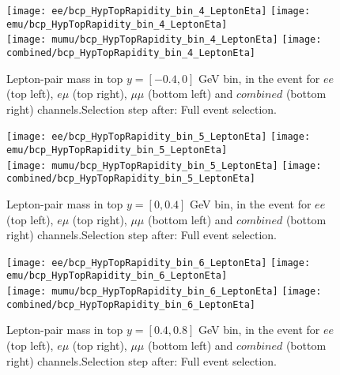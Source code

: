 \documentclass[12pt, a4paper, titlepage]{article}
\begin{document}
\begin{figure}
  \texttt{[image: ee/bcp\_HypTopRapidity\_bin\_4\_LeptonEta]}
  \texttt{[image: emu/bcp\_HypTopRapidity\_bin\_4\_LeptonEta]}\\
  \texttt{[image: mumu/bcp\_HypTopRapidity\_bin\_4\_LeptonEta]}
  \texttt{[image: combined/bcp\_HypTopRapidity\_bin\_4\_LeptonEta]}
\caption{Lepton-pair mass in top $y = [-0.4,0]$ GeV bin, in the event for $ee$ (top left), $e\mu$ (top right), $\mu\mu$ (bottom left) and $combined$ (bottom right) channels.\newline Selection step after: Full event selection.}
\end{figure}

\clearpage
\newpage


\begin{figure}
  \texttt{[image: ee/bcp\_HypTopRapidity\_bin\_5\_LeptonEta]}
  \texttt{[image: emu/bcp\_HypTopRapidity\_bin\_5\_LeptonEta]}\\
  \texttt{[image: mumu/bcp\_HypTopRapidity\_bin\_5\_LeptonEta]}
  \texttt{[image: combined/bcp\_HypTopRapidity\_bin\_5\_LeptonEta]}
\caption{Lepton-pair mass in top $y = [0,0.4]$ GeV bin, in the event for $ee$ (top left), $e\mu$ (top right), $\mu\mu$ (bottom left) and $combined$ (bottom right) channels.\newline Selection step after: Full event selection.}
\end{figure}

\clearpage
\newpage

\begin{figure}
  \texttt{[image: ee/bcp\_HypTopRapidity\_bin\_6\_LeptonEta]}
  \texttt{[image: emu/bcp\_HypTopRapidity\_bin\_6\_LeptonEta]}\\
  \texttt{[image: mumu/bcp\_HypTopRapidity\_bin\_6\_LeptonEta]}
  \texttt{[image: combined/bcp\_HypTopRapidity\_bin\_6\_LeptonEta]}
\caption{Lepton-pair mass in top $y = [0.4,0.8]$ GeV bin, in the event for $ee$ (top left), $e\mu$ (top right), $\mu\mu$ (bottom left) and $combined$ (bottom right) channels.\newline Selection step after: Full event selection.}
\end{figure}
\end{document}
